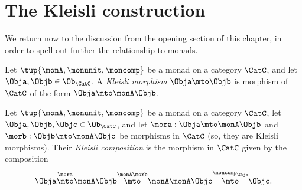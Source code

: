 

\section{The Kleisli construction}
\label{sec:Kleisli}

We return now to the discussion from the opening section of this chapter, in order to spell out further the relationship to monads. 


\begin{ctdefinition}
Let $\tup{\monA, \monunit, \moncomp}$ be a monad on a category $\CatC$, and let $\Obja, \Objb \in \Ob_\CatC$. A 
\emph{Kleisli morphism} $\Obja \mto \Objb$ is morphism of $\CatC$ of the form $\Obja \mto \monA \Objb$. 
\end{ctdefinition}


\begin{ctdefinition}
Let $\tup{\monA, \monunit, \moncomp}$ be a monad on a category $\CatC$, let $\Obja, \Objb, \Objc \in \Ob_\CatC$,  and let $\mora : \Obja \mto \monA \Objb$ and $\morb : \Objb \mto \monA \Objc$ be morphisms in $\CatC$ (so, they are Kleisli morphisms). Their \emph{Kleisli composition} is the morphism in $\CatC$ given by the composition
\begin{equation}
\Obja \overset{\mora}{\mto} \monA \Objb \overset{\monA \morb}{\mto} \monA \monA \Objc \overset{\moncomp_\Objc}{\mto} \Objc.
\end{equation}
\end{ctdefinition}


